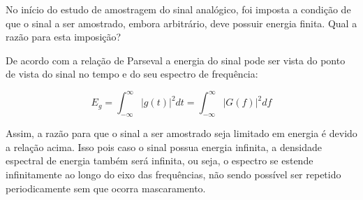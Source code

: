 No início do estudo de amostragem do sinal analógico, foi imposta a condição de que o
sinal a ser amostrado, embora arbitrário, deve possuir energia finita. Qual a razão para
esta imposição?

De acordo com a relação de Parseval a energia do sinal pode ser vista do ponto de vista do sinal no tempo e do seu espectro de frequência:

\begin{equation}
    E_g = \int_{-\infty}^{\infty} |g(t)|^2dt = \int_{-\infty}^{\infty} |G(f)|^2df 
\end{equation}

Assim, a razão para que o sinal a ser amostrado seja limitado em energia é devido a relação acima. Isso pois caso o sinal possua energia infinita, a densidade espectral de energia também será infinita, ou seja, o espectro se estende infinitamente ao longo do eixo das frequências, não sendo possível ser repetido periodicamente sem que ocorra mascaramento.